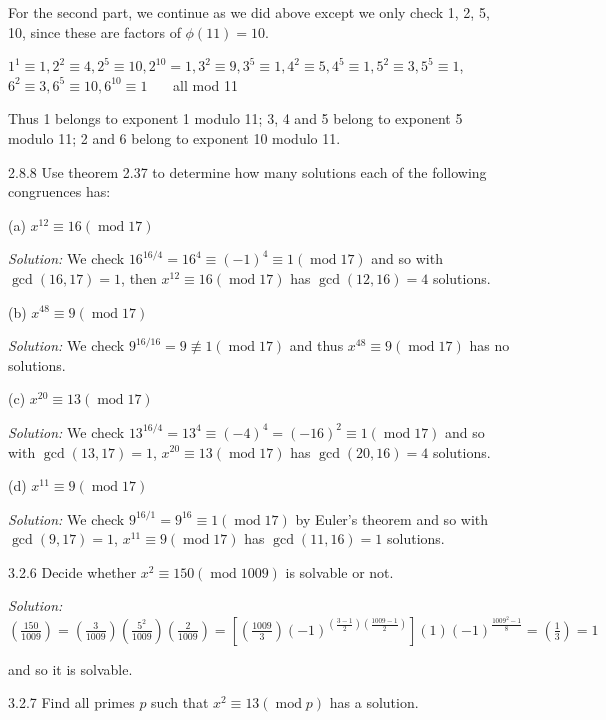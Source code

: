 \documentclass{letter}
\newcommand{\nequiv}{\not\equiv}
\newcommand{\tmem}[1]{{\em #1\/}}
\newcommand{\tmop}[1]{\ensuremath{\operatorname{#1}}}
\begin{document}
For the second part, we continue as we did above except we only check 1, 2, 5,
10, since these are factors of $\phi (11) = 10$.

$1^1 \equiv 1, 2^2 \equiv 4, 2^5 \equiv 10, 2^{10} = 1, 3^2 \equiv 9, 3^5
\equiv 1, 4^2 \equiv 5, 4^5 \equiv 1, 5^2 \equiv 3, 5^5 \equiv 1$, $6^2 \equiv
3, 6^5 \equiv 10, 6^{10} \equiv 1$ \ \ \ all mod 11

Thus 1 belongs to exponent 1 modulo 11; 3, 4 and 5 belong to exponent 5 modulo
11; 2 and 6 belong to exponent 10 modulo 11.

2.8.8 Use theorem 2.37 to determine how many solutions each of the following
congruences has:

(a) $x^{12} \equiv 16 (\tmop{mod} 17)$

{\tmem{Solution:}} We check $16^{16 / 4} = 16^4 \equiv (- 1)^4 \equiv 1
(\tmop{mod} 17)$ and so with $\gcd (16, 17) = 1$, then $x^{12} \equiv 16
(\tmop{mod} 17)$ has $\gcd (12, 16) = 4$ solutions.

(b) $x^{48} \equiv 9 (\tmop{mod} 17)$

{\tmem{Solution:}} We check $9^{16 / 16} = 9 \nequiv 1 (\tmop{mod} 17)$ and
thus $x^{48} \equiv 9 (\tmop{mod} 17)$ has no solutions.

(c) $x^{20} \equiv 13 (\tmop{mod} 17)$

{\tmem{Solution:}} We check $13^{16 / 4} = 13^4 \equiv (- 4)^4 = (- 16)^2
\equiv 1 (\tmop{mod} 17)$ and so with $\gcd (13, 17) = 1$, $x^{20} \equiv 13
(\tmop{mod} 17)$ has $\gcd (20, 16) = 4$ solutions.

(d) $x^{11} \equiv 9 (\tmop{mod} 17)$

{\tmem{Solution:}} We check $9^{16 / 1} = 9^{16} \equiv 1 (\tmop{mod} 17)$ by
Euler's theorem and so with $\gcd (9, 17) = 1$, $x^{11} \equiv 9 (\tmop{mod}
17)$ has $\gcd (11, 16) = 1$ solutions.

3.2.6 Decide whether $x^2 \equiv 150 (\tmop{mod} 1009)$ is solvable or not.

{\tmem{Solution:}} $\left( \frac{150}{1009} \right) = \left( \frac{3}{1009}
\right) \left( \frac{5^2}{1009} \right) \left( \frac{2}{1009} \right) = [
\left( \frac{1009}{3} \right) (- 1)^{( \frac{3 - 1}{2}) ( \frac{1009 -
1}{2})}] (1) (- 1)^{\frac{1009^2 - 1}{8}} = \left( \frac{1}{3} \right) = 1$

and so it is solvable.

3.2.7 Find all primes $p$ such that $x^2 \equiv 13 (\tmop{mod} p)$ has a
solution.
\end{document}
